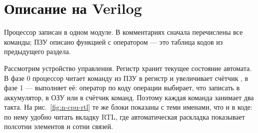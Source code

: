 \section{Описание на Verilog}

Процессор записан в одном модуле. В комментариях сначала перечислены все
команды; ПЗУ описано функцией с оператором  --- это таблица кодов
из предыдущего раздела.


Рассмотрим устройство управления. Регистр  хранит текущее
состояние автомата. В фазе 0 процессор читает команду из ПЗУ в регистр
 и увеличивает счётчик , в фазе 1 --- выполняет её: оператор
 по коду операции выбирает, что записать в аккумулятор, в ОЗУ или
в счётчик команд. Поэтому каждая команда занимает два такта. На рис.~\ref{fig:n-cpu-rtl} те же блоки
показаны с теми именами, что и в коде: по нему удобно читать вкладку RTL, где
автоматическая раскладка показывает полсотни элементов и сотни связей.

